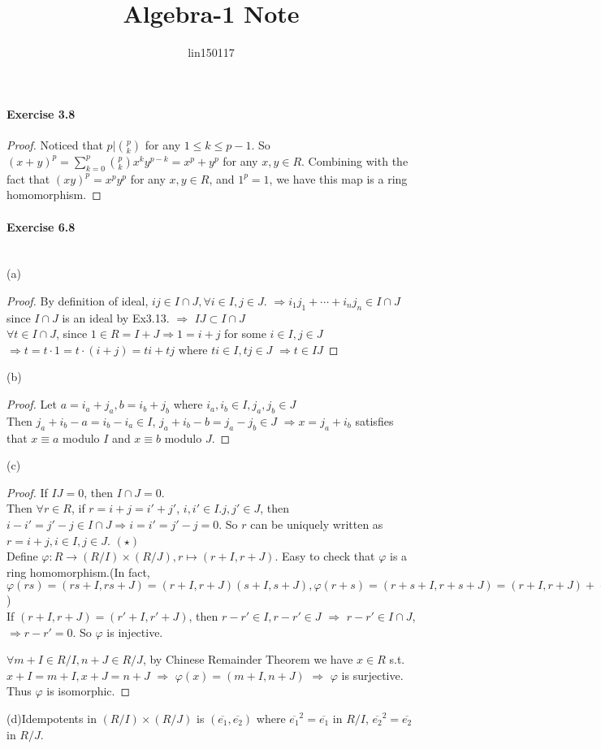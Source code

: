 \documentclass{article}
\title{Algebra-1 Note}
\author{lin150117 }
\date{}
\begin{document}
\setlength{\parindent}{0pt}
\paragraph{Exercise 3.8}
\begin{proof}
    Noticed that  $ p|\binom{p}{k}  $ for any  $ 1 \leq k \leq p-1 $. So  $ (x+y)^p=\sum\limits_{k=0}^p\binom{p }{k }x^ky^{p-k}=x^p+y^p $ for any  $ x,y\in R $. Combining with the fact that  $ (xy)^p=x^py^p $ for any  $ x,y\in R $, and  $ 1^p=1 $, we have this map is a ring homomorphism.
\end{proof}
\paragraph{Exercise 6.8}
\,\\
(a)\begin{proof}
    By definition of ideal,  $ ij\in I\cap J, \forall i\in I, j\in J $.  $ \Rightarrow i_1j_1+\cdots+i_nj_n\in I\cap J $ since  $ I\cap J  $ is an ideal by Ex3.13. $ \Rightarrow $  $ IJ\subset I\cap J $\\ 
     $ \forall t\in I\cap J $, since  $ 1\in R=I+J \Rightarrow 1=i+j  $ for some  $ i\in I,j\in J $ $\Rightarrow  t=t\cdot 1=t\cdot(i+j)=ti+tj $ where  $ ti\in I,tj\in J $ $ \Rightarrow  t\in IJ $    
\end{proof}
(b)
\begin{proof}
    Let  $ a=i_a+j_a,b=i_b+j_b $ where  $ i_a,i_b\in I,j_a,j_b\in J $\\
    Then  $ j_a+i_b-a=i_b-i_a\in I $,  $ j_a+i_b-b=j_a-j_b\in J $  $ \Rightarrow x=j_a+i_b $ satisfies that  $ x\equiv a  $ modulo  $ I  $ and  $ x\equiv b  $ modulo  $ J  $.     
\end{proof}
(c)
\begin{proof}
    If  $ IJ=0 $, then  $ I\cap J=0 $.\\
    Then  $ \forall r\in R $, if  $ r=i+j=i'+j' $,  $ i,i'\in I.j,j'\in J $,  then  $ i-i'=j'-j\in I\cap J \Rightarrow i=i'=j'-j=0 $. So  $ r  $ can be uniquely written as  $ r=i+j,i\in I,j\in J $. $ (\star) $ \\
    Define  $ \varphi:R\rightarrow (R/I)\times (R/J), r\mapsto (r+I,r+J)$. Easy to check that  $ \varphi $ is a ring homomorphism.(In fact,  $ \varphi(rs)=(rs+I,rs+J)=(r+I,r+J)(s+I,s+J),\varphi(r+s)=(r+s+I,r+s+J)=(r+I,r+J)+(s+I,s+J) $) \\If  $ (r+I,r+J)=(r'+I,r'+J) $, then  $ r-r'\in I,r-r'\in J $ $ \Rightarrow  $ 
     $ r-r'\in I\cap J $,  $\Rightarrow r-r'=0$. So  $ \varphi  $ is injective.
     
     $ \forall m+I\in R/I,n+J\in R/J $, by Chinese Remainder Theorem we have  $ x\in R  $ s.t.  $ x+I=m+I,x+J=n+J $ $ \Rightarrow  $  $ \varphi(x)=(m+I,n+J) $ $ \Rightarrow  $  $ \varphi  $ is surjective. Thus  $ \varphi  $ is isomorphic.            
\end{proof}
(d)Idempotents in  $ (R/I)\times(R/J)  $ is  $ (\overline{e_1},\overline{e_2}) $ where  $ \overline{e_1}^2=\overline{e_1} $ in  $ R/I $, $ \overline{e_2}^2=\overline{e_2} $  in  $ R/J $.
\end{document}
